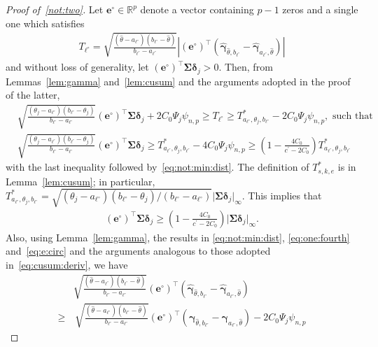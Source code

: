 \documentclass[11pt, a4paper]{article}
\newcommand{\mbf}{\mathbf}
\renewcommand{\l}{\left}
\renewcommand{\r}{\right}
\def\wh{\widehat}
\newcommand{\cp}{\theta}
\newcommand{\R}{\mathbb{R}}
\theoremstyle{definition}
\theoremstyle{definition}
\theoremstyle{definition}
\theoremstyle{definition}
\theoremstyle{definition}
\theoremstyle{remark}
\theoremstyle{definition}
\theoremstyle{definition}
\theoremstyle{definition}
\begin{document}
\begin{proof}[Proof of~\ref{not:two}]
	Let $\mbf e^\circ \in \R^p$ denote a vector containing $p - 1$ zeros and a single one which satisfies
	\begin{align*}
	T_{\ell^\circ} = \sqrt{\frac{(\wh\cp - a_{\ell^\circ})(b_{\ell^\circ} - \wh\cp)}{b_{\ell^\circ} - a_{\ell^\circ}}} \l\vert (\mbf e^\circ)^\top \l(\wh{\bm\gamma}_{\wh\cp, b_{\ell^\circ}} - \wh{\bm\gamma}_{a_{\ell^\circ}, \wh\cp}\r) \r\vert
	\end{align*}
	and without loss of generality, let $(\mbf e^\circ)^\top \bm\Sigma \bm\delta_j > 0$.
	Then, from Lemmas~\ref{lem:gamma} and~\ref{lem:cusum} and the arguments adopted in the proof of the latter, 
	\begin{align*}
	& \sqrt{\frac{(\cp_j - a_{\ell^\circ})(b_{\ell^\circ} - \cp_j)}{b_{\ell^\circ} - a_{\ell^\circ}}} (\mbf e^\circ)^\top \bm\Sigma \bm\delta_j + 2 C_0 \Psi_j \psi_{n, p} \ge T_{\ell^\circ} \ge T^*_{a_{\ell^\circ}, \cp_j, b_{\ell^\circ}} - 2 C_0 \Psi_j \psi_{n, p}, \text{ \ such that}
	\\
	& \sqrt{\frac{(\cp_j - a_{\ell^\circ})(b_{\ell^\circ} - \cp_j)}{b_{\ell^\circ} - a_{\ell^\circ}}} (\mbf e^\circ)^\top \bm\Sigma \bm\delta_j \ge T^*_{a_{\ell^\circ}, \cp_j, b_{\ell^\circ}}  - 4 C_0 \Psi_j \psi_{n, p} \ge \l( 1 - \frac{4 C_0}{c^\prime - 2 C_0} \r) T^*_{a_{\ell^\circ}, \cp_j, b_{\ell^\circ}} 
	\end{align*}
	with the last inequality followed by~\eqref{eq:not:min:dist}.
	The definition of $T^*_{s, k, e}$ is in Lemma~\ref{lem:cusum}; in particular, $T^*_{a_{\ell^\circ}, \cp_j, b_{\ell^\circ}} = \sqrt{(\cp_j - a_{\ell^\circ})(b_{\ell^\circ} - \cp_j)/(b_{\ell^\circ} - a_{\ell^\circ})} \vert \bm\Sigma \bm\delta_j \vert_\infty$.
	This implies that 
	\begin{align}
	\label{eq:e:circ}
	(\mbf e^\circ)^\top \bm\Sigma \bm\delta_j \ge \l( 1 - \frac{4 C_0}{c^\prime - 2 C_0} \r) \vert \bm\Sigma \bm\delta_j \vert_\infty.
	\end{align}
	Also, using Lemma~\ref{lem:gamma}, the results in \eqref{eq:not:min:dist}, \eqref{eq:one:fourth} and~\eqref{eq:e:circ} and the arguments analogous to those adopted in~\eqref{eq:cusum:deriv}, we have
	\begin{align*}
	& \sqrt{\frac{(\wh\cp - a_{\ell^\circ})(b_{\ell^\circ} - \wh\cp)}{b_{\ell^\circ} - a_{\ell^\circ}}} (\mbf e^\circ)^\top \l( \wh{\bm\gamma}_{\wh\cp, b_{\ell^\circ}} - \wh{\bm\gamma}_{a_{\ell^\circ}, \wh\cp} \r) 
	\\
	\ge & \,
	\sqrt{\frac{(\wh\cp - a_{\ell^\circ})(b_{\ell^\circ} - \wh\cp)}{b_{\ell^\circ} - a_{\ell^\circ}}} (\mbf e^\circ)^\top \l( \bm\gamma_{\wh\cp, b_{\ell^\circ}} - \bm\gamma_{a_{\ell^\circ}, \wh\cp} \r) - 2 C_0 \Psi_j \psi_{n, p}

\end{align*}
\end{proof}
\end{document}
